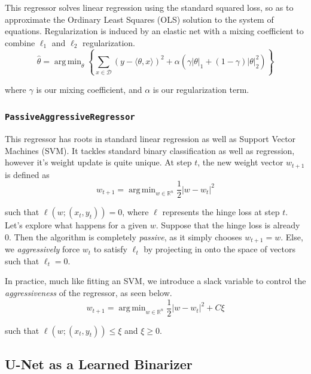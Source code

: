 \documentclass[paper=letter, fontsize=12pt]{article}
\numberwithin{equation}{section} %
\numberwithin{figure}{section} %
\numberwithin{table}{section} %
\newcommand{\abs}[1]{\left|#1\right|}
\DeclareMathOperator*{\argmin}{arg\,min}
\begin{document}
This regressor solves linear regression using the standard squared loss, so as
to approximate the Ordinary Least Squares (OLS) solution to the system of
equations.  Regularization is induced by an elastic net with a mixing
coefficient to combine $\ell_1$ and $\ell_2$ regularization.
\begin{equation*}
    \hat{\theta} = \argmin_\theta
        \left\{ \sum_{x \in \mathcal{D}} (y - \langle \theta, x \rangle)^2
                + \alpha\left(
                    \gamma\abs{\theta}_1 + (1 - \gamma)\abs{\theta}^2_2
                  \right)
        \right\}
\end{equation*}

where $\gamma$ is our mixing coefficient, and $\alpha$ is our regularization
term.

\subsubsection{\texttt{PassiveAggressiveRegressor}}

This regressor has roots in standard linear regression as well as Support
Vector Machines (SVM).\cite{paregression}  It tackles standard binary classification
as well as regression, however it's weight update is quite unique.  At step
$t$, the new weight vector $w_{t+1}$ is defined as
\begin{equation*}
    w_{t+1} = \argmin_{w \in \mathbb{R}^n} \frac{1}{2}\abs{w - w_t}^2
\end{equation*}

such that $\ell(w; (x_t, y_t)) = 0$, where $\ell$ represents the hinge loss at
step $t$.  Let's explore what happens for a given $w$.  Suppose that the hinge
loss is already 0.  Then the algorithm is completely \textit{passive}, as it
simply chooses $w_{t+1} = w$.  Else, we \textit{aggressively} force $w_t$
to satisfy $\ell_t$ by projecting in onto the space of vectors such that
$\ell_t = 0$.

In practice, much like fitting an SVM, we introduce a slack variable to control
the \textit{aggressiveness} of the regressor, as seen below.
\begin{equation*}
    w_{t+1} = \argmin_{w \in \mathbb{R}^n} \frac{1}{2}\abs{w - w_t}^2 + C\xi
\end{equation*}

such that $\ell(w; (x_t, y_t)) \le \xi$ and $\xi \ge 0$.

\subsection{U-Net as a Learned Binarizer}
\end{document}
